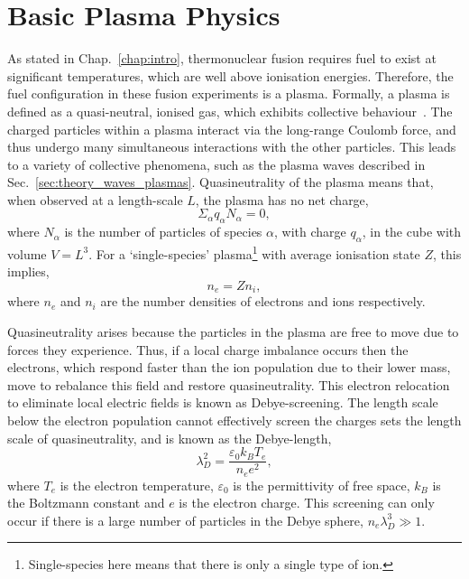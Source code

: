 \section{Basic Plasma Physics}%
\label{sec:theory_plasma_phys}

As stated in Chap.~\ref{chap:intro}, thermonuclear fusion requires fuel to exist at significant temperatures, which are well above ionisation energies.
Therefore, the fuel configuration in these fusion experiments is a plasma.
Formally, a plasma is defined as a quasi-neutral, ionised gas, which exhibits collective behaviour~\cite{chen_introduction_2018}.
The charged particles within a plasma interact via the long-range Coulomb force, and thus undergo many simultaneous interactions with the other particles.
This leads to a variety of collective phenomena, such as the plasma waves described in Sec.~\ref{sec:theory_waves_plasmas}.
Quasineutrality of the plasma means that, when observed at a length-scale $L$, the plasma has no net charge,
\begin{equation}
    \Sigma_{\alpha}q_{\alpha}N_{\alpha} = 0,
\end{equation}
where $N_{\alpha}$ is the number of particles of species $\alpha$, with charge $q_{\alpha}$, in the cube with volume $V=L^3$.
For a `single-species' plasma\footnote{Single-species here means that there is only a single type of ion.} with average ionisation state $Z$, this implies,
\begin{equation}
    n_e = Z n_i,
\end{equation}
where $n_e$ and $n_i$ are the number densities of electrons and ions respectively.

Quasineutrality arises because the particles in the plasma are free to move due to forces they experience.
Thus, if a local charge imbalance occurs then the electrons, which respond faster than the ion population due to their lower mass, move to rebalance this field and restore quasineutrality.
This electron relocation to eliminate local electric fields is known as Debye-screening.
The length scale below the electron population cannot effectively screen the charges sets the length scale of quasineutrality, and is known as the Debye-length,
\begin{equation}
    \lambda_{D}^2 = \frac{\varepsilon_0 k_B T_e}{n_e e^2},
\end{equation}
where $T_e$ is the electron temperature, $\varepsilon_0$ is the permittivity of free space, $k_B$ is the Boltzmann constant and $e$ is the electron charge.
This screening can only occur if there is a large number of particles in the Debye sphere, $n_e \lambda_D^3\gg 1$.

